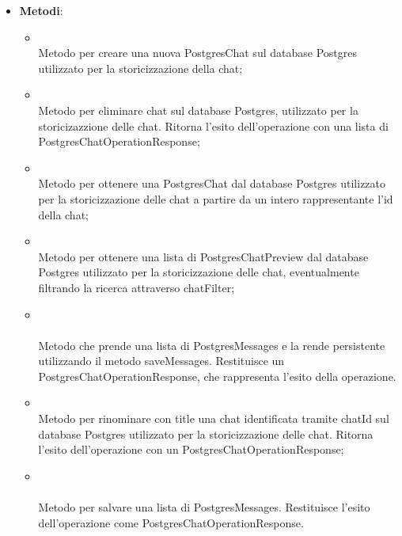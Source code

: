 \documentclass[10pt, a4paper]{article}
\begin{document}
\label{PostgresChatORMDettaglio}
\begin{itemize}
    \item \textbf{Metodi}:
    \begin{itemize}
        \item {}\\
        Metodo per creare una nuova PostgresChat sul database Postgres utilizzato per la storicizzazione della chat;

        \item {}\\
        Metodo per eliminare chat sul database Postgres, utilizzato per la storicizazzione delle chat. Ritorna l'esito dell'operazione con una lista di PostgresChatOperationResponse;
        
        \item {}\\
        Metodo per ottenere una PostgresChat dal database Postgres utilizzato per la storicizzazione delle chat a partire da un intero rappresentante l'id della chat;

        \item {}\\
        Metodo per ottenere una lista di PostgresChatPreview dal database Postgres utilizzato per la storicizzazione delle chat, eventualmente filtrando la ricerca attraverso chatFilter;

        \item {}\\ \\
        Metodo che prende una lista di PostgresMessages e la rende persistente utilizzando il metodo saveMessages. Restituisce un PostgresChatOperationResponse, che rappresenta l'esito della operazione.
        
        \item {}\\
        Metodo per rinominare con title una chat identificata tramite chatId sul database Postgres utilizzato per la storicizzazione delle chat. Ritorna l'esito dell'operazione con un PostgresChatOperationResponse;
        
        \item {}\\ \\
        Metodo per salvare una lista di PostgresMessages. Restituisce l'esito dell'operazione come PostgresChatOperationResponse.
        
        
    \end{itemize}
\end{itemize}
\end{document}
